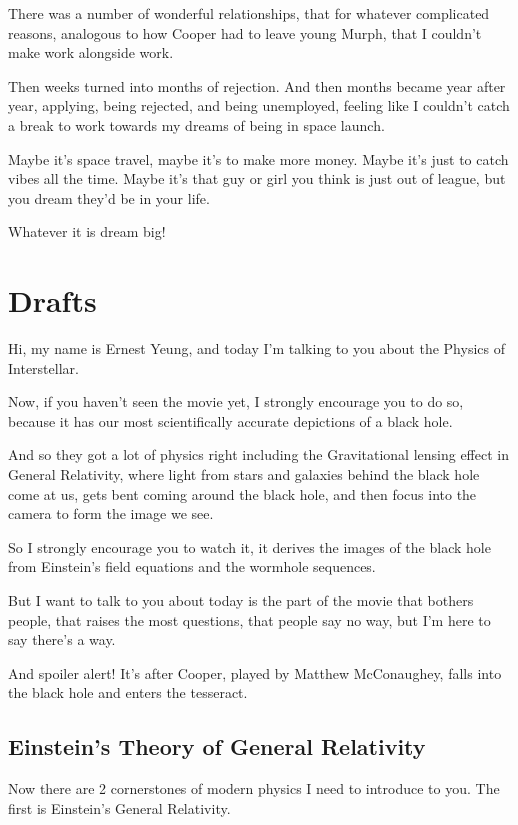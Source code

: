 \documentclass[10pt]{amsart}
\begin{document}
There was a number of wonderful relationships, that for whatever complicated reasons, analogous to how Cooper had to leave young Murph, that I couldn't make work alongside work.

Then weeks turned into months of rejection. And then months became year after year, applying, being rejected, and being unemployed, feeling like I couldn't catch a break to work towards my dreams of being in space launch.

Maybe it's space travel, maybe it's to make more money. Maybe it's just to catch vibes all the time.
Maybe it's that guy or girl you think is just out of league, but you dream they'd be in your life.

Whatever it is dream big!



\section{Drafts}


Hi, my name is Ernest Yeung, and today I'm talking to you about the Physics of Interstellar.

Now, if you haven't seen the movie yet, I strongly encourage you to do so, because it has our most scientifically accurate depictions of a black hole.

And so they got a lot of physics right including the Gravitational lensing effect in General Relativity, where light from stars and galaxies behind the black hole come at us, gets bent coming around the black hole, and then focus into the camera to form the image we see.

So I strongly encourage you to watch it, it derives the images of the black hole from Einstein's field equations and the wormhole sequences.

But I want to talk to you about today is the part of the movie that bothers people, that raises the most questions, that people say no way, but I'm here to say there's a way.

And spoiler alert! It's after Cooper, played by Matthew McConaughey, falls into the black hole and enters the tesseract.

\subsection{Einstein's Theory of General Relativity}

Now there are 2 cornerstones of modern physics I need to introduce to you. The first is Einstein's General Relativity.
\end{document}
